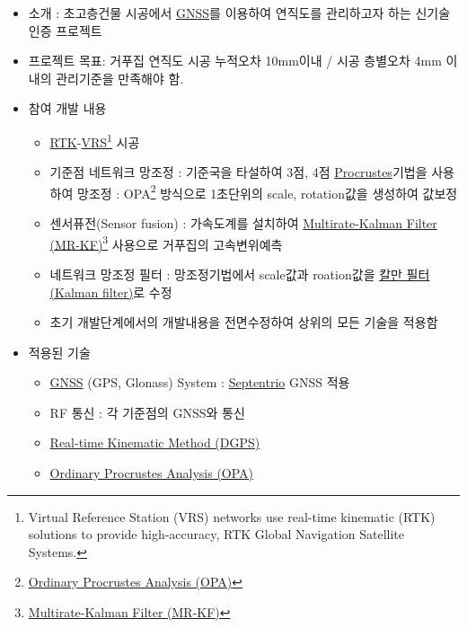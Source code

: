 \begin{itemize}
	\item 소개 : 초고층건물 시공에서 \href{http://gnss.ngii.go.kr/info/summary}{GNSS}를 이용하여 연직도를 관리하고자 하는 신기술 인증 프로젝트
	\item 프로젝트 목표: 거푸집 연직도 시공 누적오차 10mm이내 / 시공 층별오차 4mm 이내의 관리기준을 만족해야 함.
	\item 참여 개발 내용
	      \begin{itemize}
		      \item \href{https://en.wikipedia.org/wiki/Real_Time_Kinematic}{RTK}-\href{https://en.wikipedia.org/wiki/Virtual_Reference_Station}{VRS}\footnote{Virtual Reference Station (VRS) networks use real-time kinematic (RTK) solutions to provide high-accuracy, RTK Global Navigation Satellite Systems.} 시공
		      \item 기준점 네트워크 망조정 : 기준국을 타설하여 3점, 4점 \href{https://en.wikipedia.org/wiki/Procrustes_analysis}{Procrustes}기법을 사용하여 망조정 : OPA\footnote{\href{https://en.wikipedia.org/wiki/Procrustes_analysis}{Ordinary Procrustes Analysis (OPA)}} 방식으로 1초단위의 scale, rotation값을 생성하여 값보정
		      \item 센서퓨전(Sensor fusion) : 가속도계를 설치하여 \href{http://scholar.lib.vt.edu/theses/available/etd-062899-064821/unrestricted/etd.PDF}{Multirate-Kalman Filter (MR-KF)}\footnote{\href{http://scholar.lib.vt.edu/theses/available/etd-062899-064821/unrestricted/etd.PDF}{Multirate-Kalman Filter (MR-KF)}} 사용으로 거푸집의 고속변위예측
		      \item 네트워크 망조정 필터 : 망조정기법에서 scale값과 roation값을 \href{https://ko.wikipedia.org/wiki/\%EC\%B9\%BC\%EB\%A7\%8C_\%ED\%95\%84\%ED\%84\%B0}{칼만 필터(Kalman filter)}로 수정
		      \item 초기 개발단계에서의 개발내용을 전면수정하여 상위의 모든 기술을 적용함
	      \end{itemize}
	\item 적용된 기술
	      \begin{itemize}
		      \item \href{http://gnss.ngii.go.kr/info/summary}{GNSS} (GPS, Glonass) System : \href{http://www.septentrio.com/}{Septentrio} GNSS 적용
		      \item RF 통신 : 각 기준점의 GNSS와 통신
		      \item \href{https://en.wikipedia.org/wiki/Differential_GPS}{Real-time Kinematic Method (DGPS)}
		      \item \href{https://en.wikipedia.org/wiki/Procrustes_analysis}{Ordinary Procrustes Analysis (OPA)}

\end{itemize}
\end{itemize}
